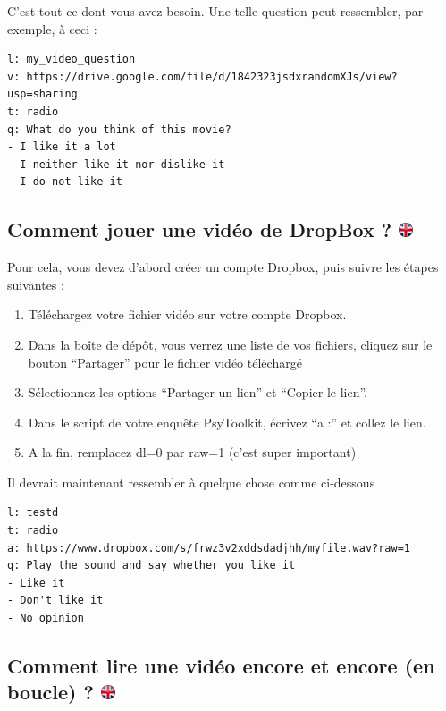 \documentclass[
]{book}
\providecommand{\tightlist}{%
  \setlength{\itemsep}{0pt}\setlength{\parskip}{0pt}}
\begin{document}
C'est tout ce dont vous avez besoin. Une telle question peut ressembler, par exemple, à ceci :

\begin{verbatim}
l: my_video_question
v: https://drive.google.com/file/d/1842323jsdxrandomXJs/view?usp=sharing
t: radio
q: What do you think of this movie?
- I like it a lot
- I neither like it nor dislike it
- I do not like it
\end{verbatim}

\hypertarget{comment-jouer-une-viduxe9o-de-dropbox}{%
\subsection[Comment jouer une vidéo de DropBox ? ]{\texorpdfstring{Comment jouer une vidéo de DropBox ? \href{https://www.psytoolkit.org/lessons/surveyaudiovideo.html\#_how_to_play_a_sound_from_dropbox}{\protect\includegraphics{img/ukflag.png}}}{Comment jouer une vidéo de DropBox ? }}\label{comment-jouer-une-viduxe9o-de-dropbox}}

Pour cela, vous devez d'abord créer un compte Dropbox, puis suivre les étapes suivantes :

\begin{enumerate}
\def\labelenumi{\arabic{enumi}.}
\tightlist
\item
  Téléchargez votre fichier vidéo sur votre compte Dropbox.
\item
  Dans la boîte de dépôt, vous verrez une liste de vos fichiers, cliquez sur le bouton ``Partager'' pour le fichier vidéo téléchargé
\item
  Sélectionnez les options ``Partager un lien'' et ``Copier le lien''.
\item
  Dans le script de votre enquête PsyToolkit, écrivez ``a :'' et collez le lien.
\item
  A la fin, remplacez dl=0 par raw=1 (c'est super important)
\end{enumerate}

Il devrait maintenant ressembler à quelque chose comme ci-dessous

\begin{verbatim}
l: testd
t: radio
a: https://www.dropbox.com/s/frwz3v2xddsdadjhh/myfile.wav?raw=1
q: Play the sound and say whether you like it
- Like it
- Don't like it
- No opinion
\end{verbatim}

\hypertarget{comment-lire-une-viduxe9o-encore-et-encore-en-boucle}{%
\subsection[Comment lire une vidéo encore et encore (en boucle) ? ]{\texorpdfstring{Comment lire une vidéo encore et encore (en boucle) ? \href{https://www.psytoolkit.org/lessons/surveyaudiovideo.html\#_how_to_play_a_video_again_and_again_loop}{\protect\includegraphics{img/ukflag.png}}}{Comment lire une vidéo encore et encore (en boucle) ? }}\label{comment-lire-une-viduxe9o-encore-et-encore-en-boucle}}
\end{document}
